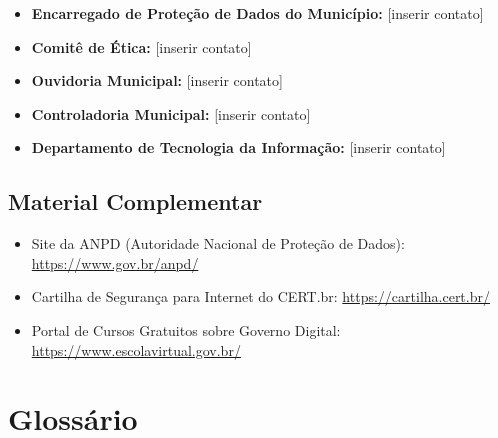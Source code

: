\documentclass[12pt,a4paper]{article}
\begin{document}
\begin{itemize}
    \item \textbf{Encarregado de Proteção de Dados do Município:} [inserir contato]
    \item \textbf{Comitê de Ética:} [inserir contato]
    \item \textbf{Ouvidoria Municipal:} [inserir contato]
    \item \textbf{Controladoria Municipal:} [inserir contato]
    \item \textbf{Departamento de Tecnologia da Informação:} [inserir contato]
\end{itemize}

\subsection{Material Complementar}
\begin{itemize}
    \item Site da ANPD (Autoridade Nacional de Proteção de Dados): \url{https://www.gov.br/anpd/}
    \item Cartilha de Segurança para Internet do CERT.br: \url{https://cartilha.cert.br/}
    \item Portal de Cursos Gratuitos sobre Governo Digital: \url{https://www.escolavirtual.gov.br/}
\end{itemize}

\newpage
\section{Glossário}
\end{document}

